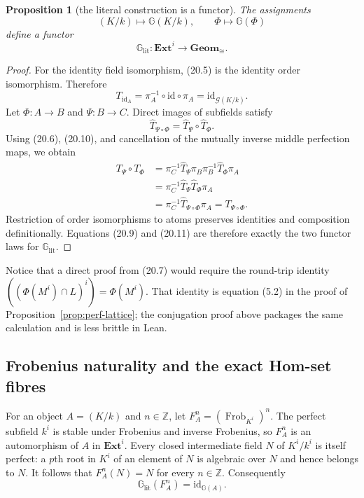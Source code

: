 \documentclass[11pt,oneside]{article}
\newtheorem{proposition}[theorem]{Proposition}
\theoremstyle{definition}
\theoremstyle{remark}
\newcommand{\Frob}{\operatorname{Frob}}
\newcommand{\G}{\mathcal{G}}
\begin{document}
\begin{proposition}[the literal construction is a functor]
The assignments
\[
 (K/k)\longmapsto\mathbb G(K/k),\qquad
 \Phi\longmapsto\mathbb G(\Phi)
\]
define a functor
\[
 \mathbb G_{\mathrm{lit}}:\mathbf{Ext}^{i}\longrightarrow
 \mathbf{Geom}_{\cong}.
\]
\end{proposition}
\begin{proof}
For the identity field isomorphism, (20.5) is the identity order isomorphism.  Therefore
\[
 T_{\mathrm{id}_A}=\pi_A^{-1}\circ\mathrm{id}\circ\pi_A
                  =\mathrm{id}_{\G(K/k)}.                     \tag{20.9}
\]
Let $\Phi:A\to B$ and $\Psi:B\to C$.  Direct images of subfields satisfy
\[
 \widehat T_{\Psi\circ\Phi}
   =\widehat T_\Psi\circ\widehat T_\Phi.                      \tag{20.10}
\]
Using (20.6), (20.10), and cancellation of the mutually inverse middle perfection maps,
we obtain
\[
\begin{aligned}
 T_\Psi\circ T_\Phi
 &=\pi_C^{-1}\widehat T_\Psi\pi_B
     \pi_B^{-1}\widehat T_\Phi\pi_A\\
 &=\pi_C^{-1}\widehat T_\Psi\widehat T_\Phi\pi_A\\
 &=\pi_C^{-1}\widehat T_{\Psi\circ\Phi}\pi_A
  =T_{\Psi\circ\Phi}.
\end{aligned}                                                  \tag{20.11}
\]
Restriction of order isomorphisms to atoms preserves identities and composition
definitionally.  Equations (20.9) and (20.11) are therefore exactly the two functor laws
for $\mathbb G_{\mathrm{lit}}$.
\end{proof}

Notice that a direct proof from (20.7) would require the round-trip identity
$((\Phi(M^i)\cap L)^i)=\Phi(M^i)$.  That identity is equation (5.2) in the proof of
Proposition~\ref{prop:perf-lattice}; the conjugation proof above packages the same
calculation and is less brittle in Lean.

\subsection{Frobenius naturality and the exact Hom-set fibres}

For an object $A=(K/k)$ and $n\in\mathbb Z$, let
$F_A^n=(\Frob_{K^i})^n$.  The perfect subfield $k^i$ is stable under Frobenius and inverse
Frobenius, so $F_A^n$ is an automorphism of $A$ in $\mathbf{Ext}^{i}$.  Every closed
intermediate field $N$ of $K^i/k^i$ is itself perfect: a $p$th root in $K^i$ of an
element of $N$ is algebraic over $N$ and hence belongs to $N$.  It follows that
$F_A^n(N)=N$ for every $n\in\mathbb Z$.  Consequently
\[
 \mathbb G_{\mathrm{lit}}(F_A^n)=\mathrm{id}_{\mathbb G(A)}.  \tag{20.12}
\]
\end{document}
